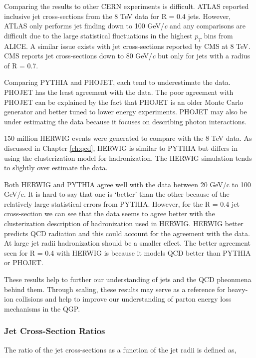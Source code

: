 Comparing the results to other CERN experiments is difficult.  ATLAS reported inclusive jet cross-sections from the 8 TeV data for R = 0.4 jets\cite{Aaboud:2017dvo}.  However, ATLAS only performs jet finding down to 100 GeV/\textit{c} and any comparisons are difficult due to the large statistical fluctuations in the highest $p_{T}$ bins from ALICE.  A similar issue exists with jet cross-sections reported by CMS at 8 TeV\cite{CMS:2013kda}.  CMS reports jet cross-sections down to 80 GeV/\textit{c} but only for jets with a radius of R = 0.7.  

Comparing PYTHIA and PHOJET, each tend to underestimate the data.  PHOJET has the least agreement with the data.  The poor agreement with PHOJET can be explained by the fact that PHOJET is an older Monte Carlo generator and better tuned to lower energy experiments.  PHOJET may also be under estimating the data because it focuses on describing photon interactions.  

150 million HERWIG events were generated to compare with the 8 TeV data.  As discussed in Chapter \ref{ch:qcd}, HERWIG is similar to PYTHIA but differs in using the clusterization model for hadronization.  The HERWIG simulation tends to slightly over estimate the data. 

Both HERWIG and PYTHIA agree well with the data between 20 GeV/c to 100 GeV/c.  It is hard to say that one is `better' than the other because of the relatively large statistical errors from PYTHIA.  However, for the R = 0.4 jet cross-section we can see that the data seems to agree better with the clusterization description of hadronization used in HERWIG.  HERWIG better predicts QCD radiation\cite{Bahr:2009ek} and this could account for the agreement with the data.  At large jet radii hadronization should be a smaller effect.  The better agreement seen for R = 0.4 with HERWIG is because it models QCD better than PYTHIA or PHOJET.

These results help to further our understanding of jets and the QCD pheonmena behind them.  Through scaling, these results may serve as a reference for heavy-ion collisions and help to improve our understanding of parton energy loss mechanisms in the QGP.  


\subsubsection{Jet Cross-Section Ratios}


\noindent
The ratio of the jet cross-sections as a function of the jet radii is defined as,

